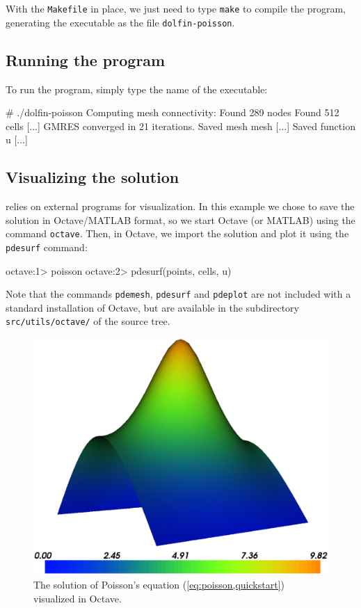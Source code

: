 With the \texttt{Makefile} in place, we just need to type
\texttt{make} to compile the program, generating the executable
as the file \texttt{dolfin-poisson}.

\subsection{Running the program}

To run the program, simply type the name of the executable:
\begin{code}
  # ./dolfin-poisson
  Computing mesh connectivity:
  Found 289 nodes
  Found 512 cells
  [...]
  GMRES converged in 21 iterations.
  Saved mesh mesh  [...]
  Saved function u [...]
\end{code}

\subsection{Visualizing the solution}

\dolfin{} relies on external programs for visualization. In this
example we chose to save the solution in Octave/MATLAB format, so we
start Octave (or MATLAB) using the command \texttt{octave}. Then, in
Octave, we import the solution and plot it using the \texttt{pdesurf} command:
\begin{code}
  octave:1> poisson
  octave:2> pdesurf(points, cells, u)
\end{code}
Note that the commands \texttt{pdemesh}, \texttt{pdesurf} and
\texttt{pdeplot} are not included with a standard installation of
Octave, but are available in the subdirectory
\texttt{src/utils/octave/} of the \dolfin{} source tree.

\begin{figure}[htbp]
  \begin{center}
    \includegraphics[width=12cm]{eps/poisson.eps}
    \caption{The solution of Poisson's equation (\ref{eq:poisson,quickstart})
      visualized in Octave.}
  \end{center}
\end{figure}
